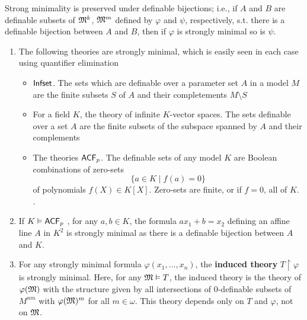 \documentclass[11pt]{article}
\begin{document}
Strong minimality is preserved under definable bijections; i.e., if \(A\) and \(B\) are
definable subsets of \(\mathfrak{M}^k\), \(\mathfrak{M}^m\) defined by \(\varphi\) and \(\psi\), respectively, s.t. there is a definable
bijection between \(A\) and \(B\), then if \(\varphi\) is strongly minimal so is \(\psi\).

\begin{examplle}[]
\begin{enumerate}
\item The following theories are strongly minimal, which is easily seen in each case using
quantifier elimination
\begin{itemize}
\item \(\operatorname{\textsf{Infset}}\). The sets which are definable over a parameter set \(A\) in a model \(M\) are
the finite subsets \(S\) of \(A\) and their completements \(M\setminus S\)
\item For a field \(K\), the theory of infinite \(K\)-vector spaces. The sets definable over a
set \(A\) are the finite subsets of the subspace spanned by \(A\) and their complements
\label{Problem3}
\item The theories \(\textsf{ACF}_p\). The definable sets of any model \(K\) are Boolean combinations of
zero-sets
\begin{equation*}
\{a\in K\mid f(a)=0\}
\end{equation*}
of polynomials \(f(X)\in K[X]\). Zero-sets are finite, or if \(f=0\), all of \(K\).
.
\end{itemize}
\item If \(K\vDash\textsf{ACF}_p\) , for any \(a,b\in K\), the formula \(ax_1+b=x_2\) defining an affine line \(A\)
in \(K^2\) is strongly minimal as there is a definable bijection between \(A\) and \(K\).
\item For any strongly minimal formula \(\varphi(x_1,\dots,x_n)\), the \textbf{induced theory} \(T\restriction\varphi\) is
strongly minimal. Here, for any \(\mathfrak{M}\vDash T\), the induced theory is the theory of \(\varphi(\mathfrak{M})\) with
the structure given by all intersections of 0-definable subsets of \(M^{nm}\) with \(\varphi(\mathfrak{M})^m\)
for all \(m\in\omega\). This theory depends only on \(T\) and \(\varphi\), not on \(\mathfrak{M}\). \label{Problem4}
\end{enumerate}
\end{examplle}
\end{document}
